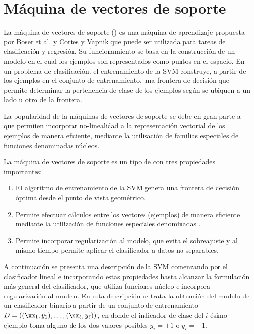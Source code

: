 %
%
%
\section{Máquina de vectores de soporte}
%
La máquina de vectores de soporte ()
es una máquina de aprendizaje propuesta por Boser et al. \cite{boser}
y Cortes y Vapnik \cite{svm} que puede ser utilizada para tareas de
clasificación y regresión. Su funcionamiento se basa en la
construcción de un modelo en el cual los ejemplos son representados
como puntos en el espacio.
En un problema de clasificación, el entrenamiento de la SVM construye,
a partir de los ejemplos en el conjunto de entrenamiento, una frontera
de decisión que permite determinar la pertenencia de clase de los
ejemplos según se ubiquen a un lado u otro de la frontera.

La popularidad de la máquinas de vectores de soporte se debe en gran
parte a que permiten incorporar no-linealidad a la representación
vectorial de los ejemplos de manera eficiente, mediante la utilización
de familias especiales de funciones denominadas núcleos.


La máquina de vectores de soporte es un tipo de  con tres propiedades importantes:
%
\begin{enumerate}
\item El algoritmo de entrenamiento de la SVM genera una frontera de
  decisión óptima desde el punto de vista geométrico.
\item Permite efectuar cálculos entre los vectores (ejemplos) de
  manera eficiente mediante la utilización de funciones especiales
  denominadas .
\item Permite incorporar regularización al modelo, que evita el
  sobreajuste y al mismo tiempo permite aplicar el clasificador a
  datos no separables.
\end{enumerate}
%
A continuación se presenta una descripción de la SVM
comenzando por el clasificador lineal e incorporando estas propiedades
hasta alcanzar la formulación más general del clasificador, que
utiliza funciones núcleo e incorpora regularización al modelo.
En esta descripción se trata la obtención del modelo de un
clasificador binario a partir de un conjunto de entrenamiento
$D=\left((\xx_1,y_1),\ldots,(\xx_\ell,y_\ell)\right)$, en donde el
indicador de clase del $i$-ésimo ejemplo toma alguno de los dos
valores posibles $y_i=+1$ o $y_i=-1$.
